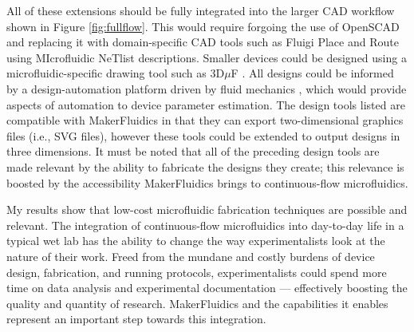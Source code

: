 All of these extensions should be fully integrated into the larger CAD workflow shown in Figure \ref{fig:fullflow}. This would require forgoing the use of OpenSCAD and replacing it with domain-specific CAD tools such as Fluigi Place and Route \cite{hu2014} using MIcrofluidic NeTlist \cite{krishna2017iwbda} descriptions. Smaller devices could be designed using a microfluidic-specific drawing tool such as 3D$\mu$F \cite{lippai2017iwbda}. All designs could be informed by a design-automation platform driven by fluid mechanics \cite{ali2017iwbda}, which would provide aspects of automation to device parameter estimation. The design tools listed are compatible with MakerFluidics in that they can export two-dimensional graphics files (i.e., SVG files), however these tools could be extended to output designs in three dimensions. It must be noted that all of the preceding design tools are made relevant by the ability to fabricate the designs they create; this relevance is boosted by the accessibility MakerFluidics brings to continuous-flow microfluidics.


My results show that low-cost microfluidic fabrication techniques are possible and relevant. The integration of continuous-flow microfluidics into day-to-day life in a typical wet lab has the ability to change the way experimentalists look at the nature of their work. Freed from the mundane and costly burdens of device design, fabrication, and running protocols, experimentalists could spend more time on data analysis and experimental documentation --- effectively boosting the quality and quantity of research. MakerFluidics and the capabilities it enables represent an important step towards this integration.
